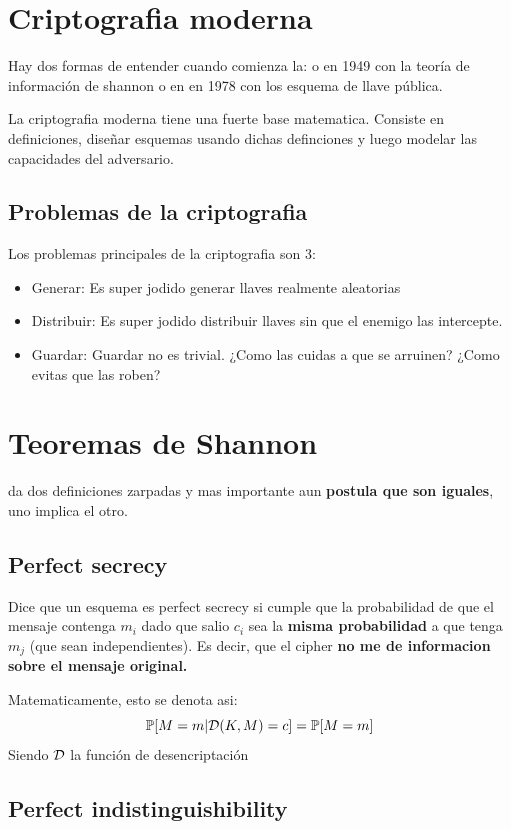 \documentclass[12pt,a4paper]{report}
\begin{document}
\section{Criptografia moderna}
Hay dos formas de entender cuando comienza la: o en 1949 con la teoría de información de shannon o en en 1978 con los esquema de llave pública.

La criptografia moderna tiene una fuerte base matematica. Consiste en definiciones, diseñar esquemas usando dichas definciones y luego modelar las capacidades del adversario.

\subsection{Problemas de la criptografia}
Los problemas principales de la criptografia son 3:
\begin{itemize}
  \item{Generar: Es super jodido generar llaves realmente aleatorias}
  \item{Distribuir: Es super jodido distribuir llaves sin que el enemigo las intercepte.}
  \item{Guardar: Guardar no es trivial. ¿Como las cuidas a que se arruinen? ¿Como evitas que las roben?}
\end{itemize}

\section{Teoremas de Shannon}
\claude da dos definiciones zarpadas y mas importante aun \textbf{postula que son iguales}, uno implica el otro.

\subsection{Perfect secrecy}
\label{perfect-secrecy}
Dice que un esquema \esquema  es perfect secrecy si cumple que la probabilidad de que el mensaje contenga $m_i$ dado que salio $c_i$ sea la \textbf{misma probabilidad} a que tenga $m_j$ (que sean independientes). Es decir, que el cipher \textbf{no me de informacion sobre el mensaje original.}

Matematicamente, esto se denota asi:
$$
\mathbb{{P}}[ M = m | \mathcal{{D}}(K, M) = c ] = \mathbb{{P}}[M=m]
$$
Siendo $\mathcal{{D}}$ la función de desencriptación

\subsection{Perfect indistinguishibility}
\end{document}
